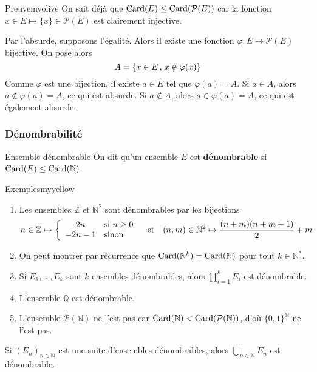     \begin{demo}{Preuve}{myolive}
        On sait déjà que $\operatorname{Card}(E) \leq \operatorname{Card}(\mathcal{P}(E))$ car la fonction $x \in E \mapsto \{x\} \in \mathcal{P}(E)$ est clairement injective. 

        Par l’absurde, supposons l’égalité. Alors il existe une fonction $\varphi : E \to \mathcal{P}(E)$ bijective. On pose alors 
        \[ A = \left\{ x \in E \, , \, x \notin \varphi(x) \right\} \]
        Comme $\varphi$ est une bijection, il existe $a \in E$ tel que $\varphi(a) = A$. Si $a \in A$, alors $a \notin \varphi(a) = A$, ce qui est absurde. Si $a \notin A$, alors $a \in \varphi(a) = A$, ce qui est également absurde. 
    \end{demo}

    \subsubsection{Dénombrabilité}

    \begin{defi}{Ensemble dénombrable}{}
        On dit qu’un ensemble $E$ est \textbf{dénombrable} si $\operatorname{Card}(E) \leq \operatorname{Card}(\mathbb{N})$.
    \end{defi}

    \begin{omed}{Exemples}{myyellow}
        \begin{enumerate}[label=\textcolor{myyellow}{(\arabic*)}]
            \item Les ensembles $\mathbb{Z}$ et $\mathbb{N}^2$ sont dénombrables par les bijections 
            \[ n \in \mathbb{Z} \mapsto \sisinon{2n}{n \geq 0}{-2n-1} \esp{et} (n,m) \in \mathbb{N}^2 \mapsto \frac{(n+m)(n+m+1)}{2} + m \]
            \item On peut montrer par récurrence que $\operatorname{Card}(\mathbb{N}^k) = \operatorname{Card}(\mathbb{N})$ pour tout $k \in \mathbb{N}^*$.
            \item Si $E_1,\ldots,E_k$ sont $k$ ensembles dénombrables, alors $\prod_{i=1}^{k} E_i$ est dénombrable.
            \item L’ensemble $\mathbb{Q}$ est dénombrable.
            \item L’ensemble $\mathcal{P}(\mathbb{N})$ ne l’est pas car $\operatorname{Card}(\mathbb{N}) < \operatorname{Card}(\mathcal{P}(\mathbb{N}))$, d’où $\big\{ 0,1 \big\}^{\mathbb{N}}$ ne l’est pas.
        \end{enumerate}
    \end{omed}

    \begin{prop}{}{}
        Si $(E_n)_{n \in \mathbb{N}}$ est une suite d’ensembles dénombrables, alors $\bigcup_{n \in \mathbb{N}} E_n$ est dénombrable.
    \end{prop}

